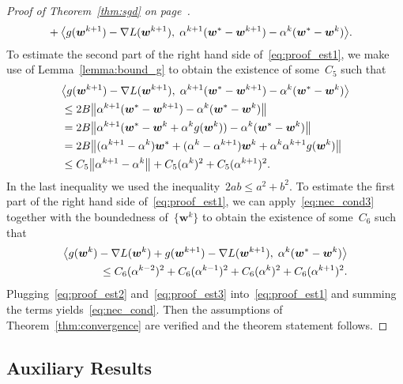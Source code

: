\begin{proof}[Proof of Theorem~\ref{thm:sgd} on page~\pageref{thm:sgd}]
\begin{equation}
\begin{aligned}
      & + \inner{ g(\bm{w}^{k+1})-\nabla L(\bm{w}^{k+1})}{\alpha^{k+1}(\bm{w}^*-\bm{w}^{k+1})-\alpha^k(\bm{w}^*-\bm{w}^{k})}.
    \end{aligned}
  \end{equation}
  To estimate the second part of the right hand side of~\eqref{eq:proof_est1}, we make use of Lemma~\ref{lemma:bound_g} to obtain the existence of some~$C_5$ such that
  \begin{equation}\label{eq:proof_est2}
    \begin{aligned}
    & \inner{ g(\bm{w}^{k+1})
    -\nabla L(\bm{w}^{k+1})}{\alpha^{k+1}(\bm{w}^*-\bm{w}^{k+1})-\alpha^k(\bm{w}^*-\bm{w}^{k})} \\
    & \leq 2B\norm{\alpha^{k+1}(\bm{w}^*-\bm{w}^{k+1})-\alpha^k(\bm{w}^*-\bm{w}^{k})} \\
    & = 2B\norm{\alpha^{k+1}(\bm{w}^*-\bm{w}^k+\alpha^kg(\bm{w}^k))-\alpha^k(\bm{w}^*-\bm{w}^{k})} \\
    & = 2B\norm{(\alpha^{k+1}-\alpha^k)\bm{w}^* + (\alpha^k-\alpha^{k+1})\bm{w}^k +\alpha^k\alpha^{k+1} g(\bm{w}^k)} \\
    & \leq C_5 \norm{\alpha^{k+1}-\alpha^k} + C_5(\alpha^k)^2 + C_5(\alpha^{k+1})^2.
    \end{aligned}
  \end{equation}
  In the last inequality we used the inequality~$2ab\leq a^2+b^2$. To estimate the first part of the right hand side of~\eqref{eq:proof_est1}, we can apply~\eqref{eq:nec_cond3} together with the boundedness of~$\{\bm{w}^k\}$ to obtain the existence of some~$C_6$ such that
  \begin{equation}\label{eq:proof_est3}
    \begin{aligned}
    \inner{ g(\bm{w}^{k}) -\nabla L(\bm{w}^{k}) + g(\bm{w}^{k+1})-\nabla L(\bm{w}^{k+1})}{\alpha^k(\bm{w}^* - \bm{w}^{k})} \\
      \leq C_6(\alpha^{k-2})^2 + C_6(\alpha^{k-1})^2 + C_6(\alpha^{k})^2 + C_6(\alpha^{k+1})^2.
      \end{aligned}
  \end{equation}
  Plugging~\eqref{eq:proof_est2} and~\eqref{eq:proof_est3} into~\eqref{eq:proof_est1} and summing the terms yields~\eqref{eq:nec_cond}. Then the assumptions of Theorem~\ref{thm:convergence} are verified and the theorem statement follows.
\end{proof}

\subsection{Auxiliary Results}\label{app:sgd3}

